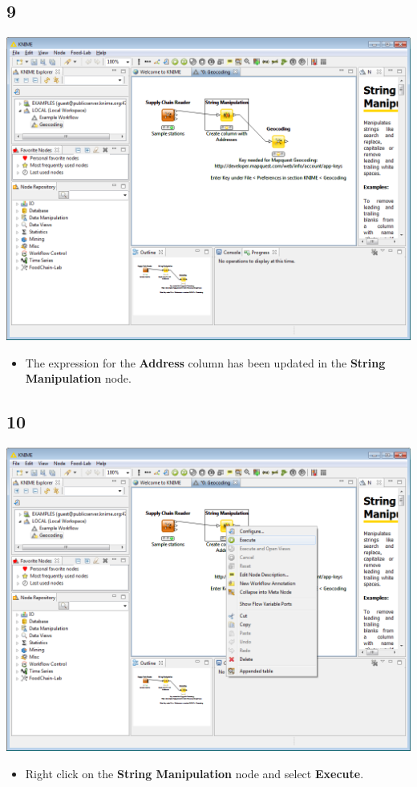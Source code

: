 \documentclass{beamer}
\begin{document}
\subsection{9}
\begin{frame}
	\begin{center}
  		\includegraphics[height=0.6\textheight]{9.png}
	\end{center}
	\begin{itemize}
		\item The expression for the \textbf{Address} column has been updated in the \textbf{String Manipulation} node.
	\end{itemize}
\end{frame}

\subsection{10}
\begin{frame}
	\begin{center}
  		\includegraphics[height=0.6\textheight]{10.png}
	\end{center}
	\begin{itemize}
		\item Right click on the \textbf{String Manipulation} node and select \textbf{Execute}.
	\end{itemize}
\end{frame}
\end{document}
